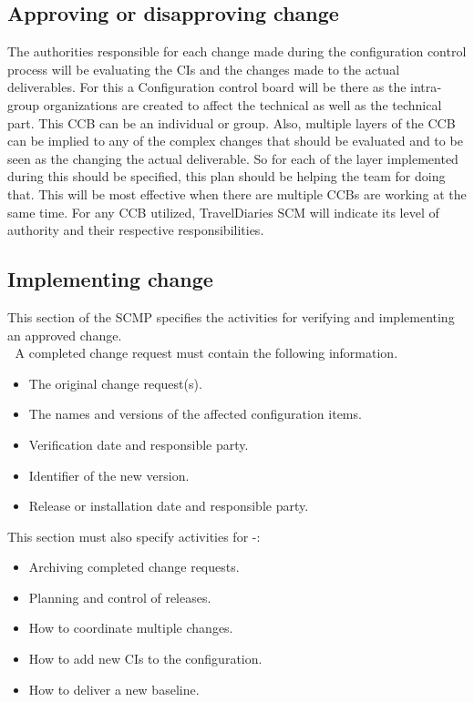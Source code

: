 \documentclass[]{article}
\begin{document}
\subsection{Approving or disapproving change}
The authorities responsible for each change made during the configuration control process will be evaluating the CIs and the changes made to the actual deliverables. For this a Configuration control board will be there as the intra­group organizations are created to affect the technical as well as the technical part. This CCB can be an individual or group. Also, multiple layers of the CCB can be implied to any of the complex changes that should be evaluated and to be seen as the changing the actual deliverable. So for each of the layer implemented during this should be specified, this plan should be helping the team for doing that. This will be most effective when there are multiple CCBs are working at the same time. For any CCB utilized, TravelDiaries SCM will indicate its level of authority and their respective responsibilities.

\subsection{Implementing change}
This section of the SCMP specifies the activities for verifying
and implementing an approved change.\\
 A completed change request must contain the following
information.\\
\begin{itemize}
\item The original change request(s).
\item The names and versions of the affected configuration items.
\item Verification date and responsible party.
\item Identifier of the new version.
\item Release or installation date and responsible party.
\end{itemize}
This section must also specify activities for -:\\
\begin{itemize}
\item Archiving completed change requests.
\item Planning and control of releases.
\item How to coordinate multiple changes.
\item How to add new CIs to the configuration.
\item How to deliver a new baseline.
\end{itemize}
\end{document}
